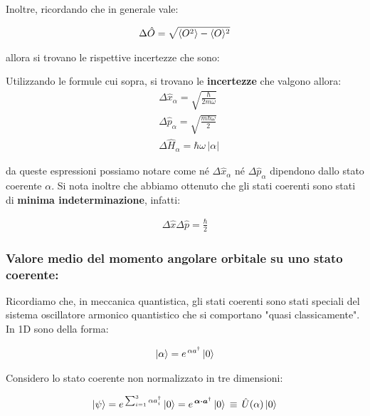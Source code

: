 	Inoltre, ricordando che in generale vale:
	
\begin{align*}
	\Delta \hat{O} = \sqrt{\langle O^2 \rangle - \langle O \rangle^2}
\end{align*}

	allora si trovano le  rispettive incertezze che sono:

\begin{mydef}
	Utilizzando le formule cui sopra, si trovano le \textbf{incertezze} che valgono allora:
\begin{align*}
	& \Delta \hat{x}_{\alpha} = \sqrt{\frac{\hbar}{2m\omega}}  \\
	& \Delta\hat{p}_{\alpha} = \sqrt{\frac{m\hbar\omega}{2}} \\
	& \Delta \hat{H}_{\alpha} = \hbar \omega \, |\alpha|
\end{align*}
\end{mydef}

	da queste espressioni possiamo notare come né $\Delta \hat{x}_{\alpha}$ né $\Delta \hat{p}_{\alpha}$ dipendono dallo stato coerente $\alpha$. Si nota inoltre che abbiamo ottenuto che gli stati coerenti sono stati di \textbf{minima indeterminazione}, infatti:
	
\begin{align*}
	\Delta \hat{x} \Delta \hat{p} = \frac{\hbar}{2}
\end{align*}
	
\subsubsection{Valore medio del momento angolare orbitale su uno stato coerente:}

	Ricordiamo che, in meccanica quantistica, gli stati coerenti sono stati speciali del sistema oscillatore armonico quantistico che si comportano "quasi classicamente". In 1D sono della forma:
	
\begin{align*}
	\ket{\alpha} = e^{\, \alpha a^{\dagger}} \ket{0}
\end{align*}

	Considero lo stato coerente non normalizzato in tre dimensioni:

\begin{align*}
	\ket{\psi} = e^{\, \sum_{i=1}^3 \alpha a_i^{\dagger}} \ket{0} = e^{\, \vb*{\alpha} \vdot \vb*{a}^{\dagger}} \ket{0} \, \equiv \, \hat{U}(\alpha) \ket{0}
\end{align*}

